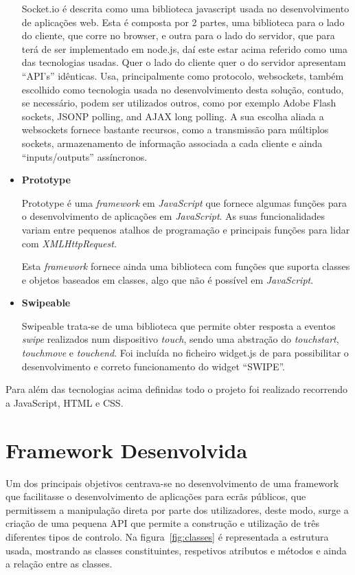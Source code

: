\begin{itemize}
Socket.io é descrita como uma biblioteca javascript usada no desenvolvimento de aplicações web. Esta é composta por 2 partes, uma biblioteca para o lado do cliente, que corre no browser, e outra para o lado do servidor, que para terá de ser implementado em node.js, daí este estar acima referido como uma das tecnologias usadas. Quer o lado do cliente quer o do servidor apresentam “API’s” idênticas. 
Usa, principalmente como protocolo, websockets, também escolhido como tecnologia usada no desenvolvimento desta solução, contudo, se necessário, podem ser utilizados outros, como por exemplo Adobe Flash sockets, JSONP polling, and AJAX long polling. 
A sua escolha aliada a websockets fornece bastante recursos, como a transmissão para múltiplos sockets, armazenamento de informação associada a cada cliente e ainda “inputs/outputs” assíncronos. 

\item \textbf{Prototype}

Prototype é uma \textit{framework} em \textit{JavaScript} que fornece algumas funções para o desenvolvimento de aplicações em \textit{JavaScript}. As suas funcionalidades variam entre pequenos atalhos de programação e principais funções para lidar com \textit{XMLHttpRequest}.

Esta \textit{framework} fornece ainda uma biblioteca com funções que suporta classes e objetos baseados em classes, algo que não é possível em \textit{JavaScript}.

\item \textbf{Swipeable}

Swipeable trata-se de uma biblioteca que permite obter resposta a eventos \textit{swipe} realizados num dispositivo \textit{touch}, sendo uma abstração do \textit{touchstart}, \textit{touchmove} e \textit{touchend}. 
Foi incluída no ficheiro widget.js de para possibilitar o desenvolvimento e correto funcionamento do widget “SWIPE”.

\end{itemize}

Para além das tecnologias acima definidas todo o projeto foi realizado recorrendo a JavaScript, HTML e CSS. 


\section{Framework Desenvolvida} \label{sec:framework}

Um dos principais objetivos centrava-se no desenvolvimento de uma framework que facilitasse o desenvolvimento de aplicações para ecrãs públicos, que permitissem a manipulação direta por parte dos utilizadores, deste modo, surge a criação de uma pequena API que permite a construção e utilização de três diferentes tipos de controlo. 
Na figura~\ref{fig:classes} é representada a estrutura usada, mostrando as classes constituintes, respetivos atributos e métodos e ainda a relação entre as classes.

